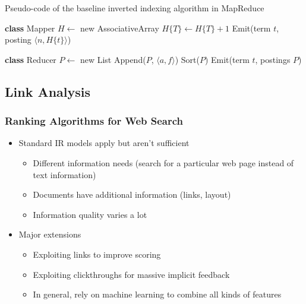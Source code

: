 \begin{algorithm}
\caption{Pseudo-code of the baseline inverted indexing algorithm in MapReduce}
\begin{algorithmic}
\State \textbf{class} Mapper
        \State $H \gets$ new AssociativeArray
            \State $H\{T\} \gets H\{T\}+1$
        \EndFor
            \State Emit(term $t$, posting $\langle n, H\{t\} \rangle$)
        \EndFor
    \EndProcedure  
    
    \State
\State \textbf{class} Reducer
        \State $P \gets$ new List
            \State Append($P$, $\langle a,f \rangle$) 
        \EndFor
        \State Sort($P$)
        \State Emit(term $t$, postings $P$)         
    \EndProcedure           
\end{algorithmic}
\end{algorithm}



\subsection{Link Analysis}

\subsubsection{Ranking Algorithms for Web Search}
\begin{itemize}
\item Standard IR models apply but aren’t sufficient 
\begin{itemize}
\item Different information needs (search for a particular web page instead of text information)
\item Documents have additional information (links, layout)
\item Information quality varies a lot
\end{itemize}

\item Major extensions
\begin{itemize}
\item Exploiting links to improve scoring
\item Exploiting clickthroughs for massive implicit feedback
\item In general, rely on machine learning to combine all kinds of features
\end{itemize}
\end{itemize}


